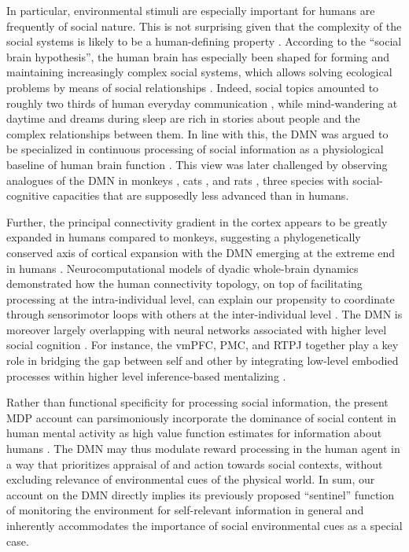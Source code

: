 \documentclass[10pt,letterpaper]{article}
\begin{document}
In particular,
environmental stimuli are especially important for humans are frequently of
social nature. This is not surprising
given that
the complexity of the social systems
is likely to be a human-defining property
\citep{tomasello2009cultural}.
According to the ``social brain hypothesis'',
the human brain has especially been shaped for
forming and maintaining increasingly complex
social systems,
which allows solving ecological problems by means of social relationships
\citep{whiten1988machiavellian}.
Indeed, social topics amounted to roughly
two thirds of human everyday communication \citep{dunbar1997human},
while
mind-wandering at daytime and dreams during sleep
are rich in stories about people and
the complex relationships between them.
%
In line with this, the DMN was argued to be specialized in
continuous processing of social information as a
physiological baseline of human brain function
\citep{schilbach2008minds}. This view was later challenged by observing
analogues of the DMN in monkeys \citep{mantini2011default},
cats \citep{popa2009contrasting},
and rats \citep{lu2012rat}, three species with
social-cognitive capacities that are supposedly less advanced than in humans.


Further,
the principal connectivity gradient in the cortex appears to be greatly expanded in humans compared to monkeys, suggesting a phylogenetically conserved axis of cortical expansion with the DMN emerging at the extreme end in humans \citep{margulies_situating_2016}. Neurocomputational models of dyadic whole-brain dynamics
demonstrated how the human connectivity topology, on top of facilitating processing at the intra-individual level, can explain our propensity to coordinate through sensorimotor loops with others at the inter-individual level \citep{dumas_anatomical_2012}.
The DMN is moreover largely overlapping with neural networks associated with higher level social cognition \citep{schilbach_introspective_2012}. For instance, the vmPFC,
PMC, and RTPJ
together play a key role in bridging the gap between self and other by
integrating low-level embodied processes within higher level inference-based mentalizing \citep{lombardo_shared_2009}.


Rather than functional specificity for processing social information,
the present MDP account can parsimoniously incorporate
the dominance of social content in
human mental activity
as high value function estimates for information about humans
\citep{baker2009action, kampe2001psychology, krienen2010clan}.
The DMN may thus modulate reward processing
in the human agent in a way that prioritizes
appraisal of and action towards social contexts,
without excluding relevance of environmental cues of the physical world.
In sum,
our account on the DMN directly implies
its previously proposed ``sentinel'' function
of monitoring the environment for self-relevant information
in general and
inherently accommodates the importance of social environmental cues
as a special case.
\end{document}
